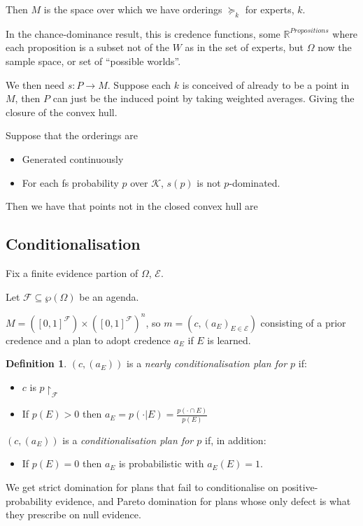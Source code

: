 \documentclass[11pt]{article}
\theoremstyle{definition}
\newtheorem{definition}[theorem]{Definition}
\theoremstyle{remark}
\newcommand{\R}{\mathbb R}
\newcommand{\agenda}{\mathcal F}
\begin{document}
Then $M$ is the space over which we have orderings $\succeq_k$ for experts, $k$.

In the chance-dominance result, this is credence functions, some $\R^{Propositions}$ where each proposition is a subset not of the $W$ as in the set of experts, but $\Omega$ now the sample space, or set of ``possible worlds''. 

We then need $s:P\to M$. 
Suppose each $k$ is conceived of already to be a point in $M$, then $P$ can just be the induced point by taking weighted averages. Giving the closure of the convex hull. 

Suppose that the orderings are
\begin{itemize}
	\item Generated continuously
	\item For each fs probability $p$ over $\mathcal{K}$, $s(p)$ is not $p$-dominated. 
\end{itemize}
Then we have that points not in the closed convex hull are 




\subsection{Conditionalisation}

Fix a finite evidence partion of $\Omega$, $\mathcal{E}$. 

Let $\agenda\subseteq\wp(\Omega)$ be an agenda.

$M=([0,1]^{\agenda})\times ([0,1]^{\agenda})^n$, so 
$m=(c,(a_E)_{E\in\mathcal{E}})$ consisting of a prior credence and a plan to adopt credence $a_E$ if $E$ is learned.

\begin{definition}
	$(c,(a_E))$ is a \emph{nearly conditionalisation plan for $p$} if:\begin{itemize}
		\item $c$ is $p\upharpoonright_\agenda$
		\item If $p(E)>0$ then $a_E=p(\cdot | E)=\frac{p(\cdot \cap E)}{p(E)}$
	\end{itemize}
		$(c,(a_E))$ is a \emph{conditionalisation plan for $p$} if, in addition:\begin{itemize}
		\item If $p(E)=0$ then $a_E$ is probabilistic with $a_E(E)=1$. 
	\end{itemize}
\end{definition}

We get strict domination for plans that fail to conditionalise on positive-probability evidence, and Pareto domination for plans whose only defect is what they prescribe on null evidence.
\end{document}
